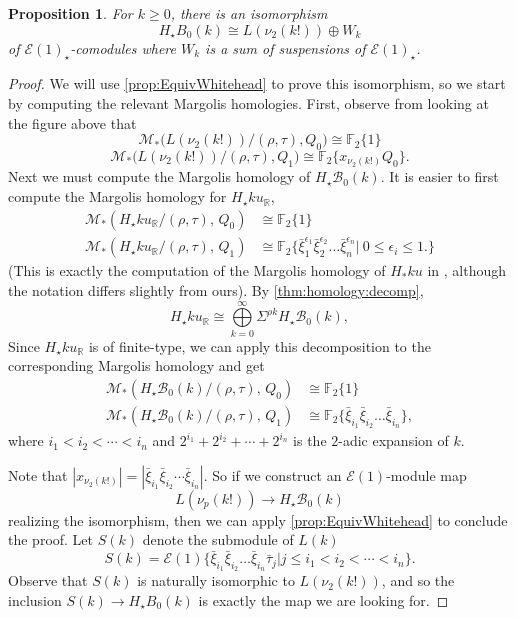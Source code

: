 \documentclass{amsart}
\newtheorem{proposition}[equation]{Proposition}
\theoremstyle{plain}
\numberwithin{equation}{section}
\numberwithin{figure}{section}
\newcommand{\mF}{{\mathbb F}}
\newcommand{\mR}{{\mathbb R}}
\newcommand{\cB}{{\mathcal B}}
\newcommand{\cE}{{\mathcal E}}
\newcommand{\cM}{{\mathcal M}}
\newcommand{\0}{\langle 0 \rangle }
\begin{document}
\begin{proposition}\label{bg lightning split}
    For $k \ge 0$, there is an isomorphism 
    \[H_{\star}B_{0}\left( k \right) \cong L(\nu_{2}(k!)) \oplus W_{k}\]
    of $\cE(1)_\star$-comodules where $W_{k}$ is a sum of suspensions of $\cE(1)_{\star}$.
\end{proposition}
\begin{proof}
We will use \cref{prop:EquivWhitehead} to prove this isomorphism, so we start by computing the relevant Margolis homologies. 
First, observe from looking at the figure above that
\[\cM_{*}\big(L(\nu_{2}(k!))/(\rho,\tau), Q_{0}\big) \cong \mF_{2}\{1\}\] \[\cM_{*}\big(L(\nu_{2}(k!))/(\rho,\tau), Q_{1}\big) \cong \mF_{2}\{x_{\nu_{2}(k!)}Q_{0} \}.\]  Next we must compute the Margolis homology of $H_{\star}\cB_{0}(k)$. It is easier to first compute the Margolis homology for $H_{\star}ku_{\mR}$,
\begin{align*}
    \cM_{*}\left(H_{\star}ku_{\mR}/(\rho,\tau), \, Q_{0}\right) & \cong \mF_{2}\{1\} \\
    \cM_{*}\left(H_{\star}ku_{\mR}/(\rho,\tau),  \,Q_{1} \right) & \cong \mF_{2}\{\bar{\xi}_{1}^{\epsilon_{1}}\bar{\xi}_{2}^{\epsilon_{2}}\ldots \bar{\xi}_{n}^{\epsilon_{n}}|\ 0 \le \epsilon_{i} \le 1 .\}
\end{align*} (This is exactly the computation of the Margolis homology of $H_{*}ku$ in \cite[Lemma~16.9]{Adams74}, although the notation differs slightly from ours). 
 By \cref{thm:homology:decomp},
 \[H_{\star}ku_{\mR} \cong \bigoplus\limits_{k=0}^{\infty}\Sigma^{\rho k}H_{\star}\cB_{0}(k),\]
 Since $H_{\star}ku_{\mR} $ is of finite-type, we can apply this decomposition to the corresponding Margolis homology and get
\begin{align*}
    \cM_{*}\left(H_{\star}\cB_{0}\left( k \right)/(\rho,\tau), \, Q_{0}\right) & \cong \mF_{2}\{1\} \\
    \cM_{*}\left(H_{\star}\cB_{0}\left( k \right)/(\rho,\tau),  \,Q_{1} \right) & \cong \mF_{2}\{\bar{\xi}_{i_{1}}\bar{\xi}_{i_{2}}\ldots \bar{\xi}_{i_{n}}\},
\end{align*}
where $i_{1} < i_{2} < \cdots < i_{n}$ and $2^{i_{1}} + 2^{i_{2}}+\cdots + 2^{i_{n}}$ is the $2$-adic expansion of $k$. 

Note that $|x_{\nu_{2}(k!)}| = |\bar{\xi}_{i_{1}}\bar{\xi}_{i_{2}}\cdots \bar{\xi}_{i_{n}}|$. So if we construct an $\cE(1)$-module map 
\[
L(\nu_{p}(k!)) \rightarrow H_{\star}\cB_{0}(k)
\]
realizing the isomorphism, then we can apply \cref{prop:EquivWhitehead} to conclude the proof. 
Let $S(k)$ denote the submodule of $L(k)$
\[S(k) = \cE(1)\{ \bar{\xi}_{i_{1}}\bar{\xi}_{i_{2}}\ldots \bar{\xi}_{i_{n}}\bar{\tau}_{j}|j \le i_{1} < i_{2} < \cdots < i_{n} \}.\]
Observe that $S(k)$ is naturally isomorphic to $L(\nu_{2}(k!))$, and so the inclusion $S(k) \to H_{\star}B_{0}(k)$ is exactly the map we are looking for.
\end{proof}
\end{document}
